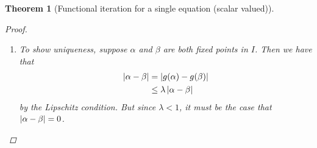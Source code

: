 \documentclass[12pt,letterpaper,DIV=11]{scrartcl}
\theoremstyle{plain}
\newtheorem{theorem}{Theorem}[section]
\theoremstyle{definition}
\theoremstyle{remark}
\newtheorem*{comment}{Comment}
\begin{document}
\begin{theorem}[Functional iteration for a single equation (scalar valued)]
\begin{proof}
\begin{enumerate}
        \begin{comment}
          How does $x_i$ approach our fixed point $\alpha$?
          Look at how far our initial guess is from $\alpha$, and the number of iterations we make: \begin{align*}
            \abs{x_m - \alpha} &= \abs{g(x_{m - 1}) - g(\alpha)} \\
                               &\leq \lambda \abs{x_{m - 1} - \alpha} && \text{by the Lipschitz condition} \\
                               &= \lambda \abs{g(x_{m - 2}) - g(\alpha)} \\
                               &\leq \lambda^2 \abs{x_{m - 2} - \alpha} \\
                               &\vdotswithin{\leq} && \text{using the Lipschitz inequality}\\
                               &\leq \lambda^m \abs{x_0 - \alpha} \\
                               &\leq \lambda^m  \rho,
          \end{align*} so each iterate is contained within a smaller and smaller set surrounding $\alpha$.
        \end{comment}

      \item To show uniqueness, suppose $\alpha$ and $\beta$ are both fixed points in $I$.
        Then we have that \begin{align*}
          \left\lvert\alpha - \beta\right\rvert &= \left\lvert g(\alpha) - g(\beta)\right\rvert \\
                               &\leq \lambda \left\lvert\alpha - \beta\right\rvert
        \end{align*} by the Lipschitz condition.
        But since $\lambda < 1$, it must be the case that $\left\lvert\alpha - \beta\right\rvert = 0$.
        \qedhere
    \end{enumerate}
  \end{proof}
\end{theorem}
\end{document}
